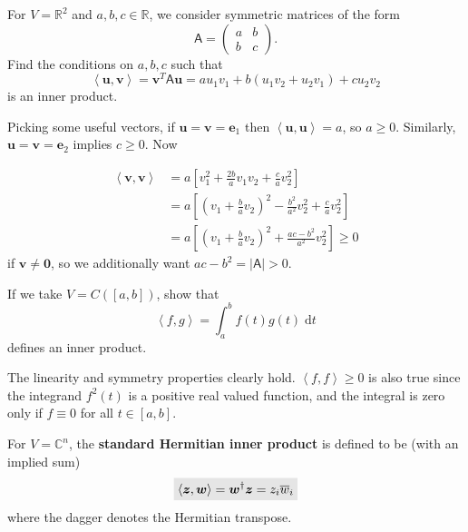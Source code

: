 \documentclass[letter-paper]{tufte-book}
\newenvironment{example}[1][Example]{\begin{trivlist}
\item[\hskip \labelsep {\bfseries #1}]}{\end{trivlist}}
\newcommand{\inner}[2]{\left\langle #1, #2\right\rangle}
\newcommand{\As}{{\mathsf{A}}}
\newcommand{\Ob}{{\boldsymbol{0}}}
\newcommand{\eb}{{\boldsymbol{e}}}
\newcommand{\ub}{{\boldsymbol{u}}}
\newcommand{\vb}{{\boldsymbol{v}}}
\newcommand{\wb}{{\boldsymbol{w}}}
\newcommand{\zb}{{\boldsymbol{z}}}
\newcommand{\highlight}[1]{\mathchoice%
  {\colorbox{black!10}{$\displaystyle#1$}}%
  {\colorbox{black!10}{$\textstyle#1$}}%
  {\colorbox{black!10}{$\scriptstyle#1$}}%
  {\colorbox{black!10}{$\scriptscriptstyle#1$}}}%
\begin{document}
\begin{example}
  For $V=\mathbb{R}^2$ and $a,b,c\in \mathbb{R}$, we consider symmetric matrices of the form
  \begin{equation*}
    \As = \begin{pmatrix}a & b \\ b & c \end{pmatrix}.
  \end{equation*}
  Find the conditions on $a,b,c$ such that
  \begin{equation*}
    \inner{\ub}{\vb} = \vb^T \As \ub = a u_1 v_1 + b (u_1 v_2 + u_2 v_1) + c u_2 v_2
  \end{equation*}
  is an inner product.
  
  Picking some useful vectors, if $\ub = \vb = \eb_1$ then $\inner{\ub}{\ub} = a$, so $a \geq 0$. Similarly, $\ub = \vb = \eb_2$ implies $c \geq 0$. Now
  
  \begin{align*}
    \inner{\vb}{\vb}
      &= a \left[v_1^2 + \frac{2b}{a} v_1 v_2 + \frac{c}{a} v_2^2\right]\\
      &= a \left[\left(v_1 + \frac{b}{a}v_2\right)^2 - \frac{b^2}{a^2} v_2^2 + \frac{c}{a}v_2^2\right]\\
      &= a \left[\left(v_1 + \frac{b}{a}v_2\right)^2 + \frac{ac - b^2}{a^2} v_2^2\right] \geq 0
  \end{align*}
  if $\vb \neq \Ob$, so we additionally want $ac - b^2 = |\As| > 0$.
\end{example}

\begin{example}
  If we take $V = C([a,b])$, show that
  \begin{equation*}
    \inner{f}{g} = \int_a^b f(t) g(t)\; \mathrm{d}t
  \end{equation*}
  defines an inner product.
  
  The linearity and symmetry properties clearly hold. $\inner{f}{f} \geq 0$ is also true since the integrand $f^2(t)$ is a positive real valued function, and the integral is zero only if $f \equiv 0$ for all $t \in [a,b]$.
\end{example}

\begin{example}
  For $V=\mathbb{C}^n$, the \textbf{standard Hermitian inner product} is defined to be (with an implied sum)
  \begin{equation}
    \highlight{\inner{\zb}{\wb} = \wb^\dagger \zb = z_i\overline{w}_i}
  \end{equation}
  where the dagger denotes the Hermitian transpose.
\end{example}
\end{document}
